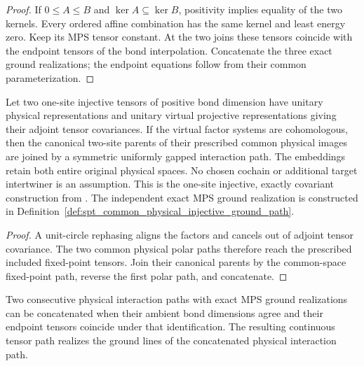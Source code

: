 \begin{proof}\leanok
    If $0\le A\le B$ and $\ker A\subseteq\ker B$, positivity implies
    equality of the two kernels. Every ordered affine combination has
    the same kernel and least energy zero. Keep its MPS tensor constant.
    At the two joins these tensors coincide with the endpoint
    tensors of the bond interpolation. Concatenate the three exact
    ground realizations; the endpoint equations follow from their
    common parameterization.
\end{proof}

\begin{lemma}
    \label{thm:spt_common_physical_injective_path}
    \leanok

    Let two one-site injective tensors of positive bond dimension have
    unitary physical representations and unitary virtual projective
    representations giving their adjoint tensor covariances. If the
    virtual factor systems are cohomologous, then the canonical
    two-site parents of their prescribed common physical images are
    joined by a symmetric uniformly gapped interaction path.
    The embeddings retain both entire original physical spaces.
    No chosen cochain or additional target intertwiner is an assumption.
    This is the one-site injective, exactly covariant construction from
    \cite[Section~II.F.2]{Schuch2011Phases}. The independent exact MPS
    ground realization is constructed in
    Definition~\ref{def:spt_common_physical_injective_ground_path}.
\end{lemma}

\begin{proof}\leanok
    A unit-circle rephasing aligns the factors and cancels out
    of adjoint tensor covariance. The two common physical polar paths
    therefore reach the prescribed included fixed-point tensors.
    Join their canonical parents by the common-space fixed-point path,
    reverse the first polar path, and concatenate.
\end{proof}

\begin{definition}
    \label{def:spt_exact_ground_path_concatenation}
    \leanok
    Two consecutive physical interaction paths with exact MPS ground
    realizations can be concatenated when their ambient bond dimensions
    agree and their endpoint tensors coincide under that identification.
    The resulting continuous tensor path realizes the ground lines of
    the concatenated physical interaction path.
\end{definition}

